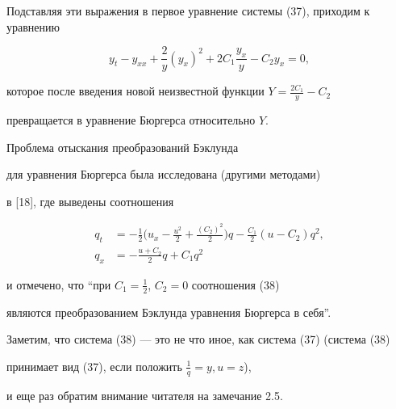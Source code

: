 Подставляя эти выражения в первое уравнение системы (37), приходим к уравнению 


$$


y_t-y_{xx}+\frac{2}{y} ({y_x})^2+2C_1 \frac{{y_x}}{y}-C_2 y_x=0,


$$


которое после введения новой неизвестной функции $Y=\frac{{2C_1}}{y}-C_2$ 


превращается в уравнение Бюргерса относительно $Y$.





\begin{notes}


Проблема отыскания преобразований Бэклунда 


для уравнения Бюргерса была исследована (другими методами) 


в [18], где выведены соотношения


\begin{equation}


\begin{split}


q_t&=- \frac{1}{2} \bigg({u_x-\frac{{u^2}}{2}+


\frac{{({C_2})^2}}{2}}\bigg)q-\frac{{C_1}}{2} ({u-C_2})q^2, \\


q_x&=- \frac{{u+C_2}}{2}q+C_1 q^2 


\end{split} 


\end{equation}


и отмечено, что ``при $C_1=\frac{1}{2}$, $C_2=0$ соотношения (38)


являются преобразованием Бэклунда уравнения Бюргерса в себя''.


Заметим, что система (38) --- это не что иное, как система (37) (система (38) 


принимает вид (37), если положить $\frac{1}{q}=y,u=z$), 


и еще раз обратим внимание читателя на замечание 2.5.


\end{notes}








